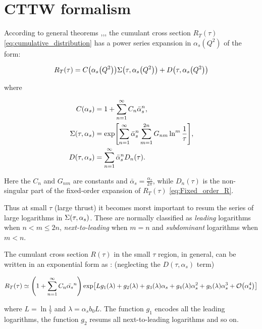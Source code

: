 \documentclass[../main.tex]{subfiles}
\begin{document}
\section{CTTW formalism}\label{sec:CTTW convention}

According to general theorems \cite{Block:1937},\cite{Kinoshita:1962ur},\cite{Lee:1964is}, 
the cumulant cross section $R_T(\tau)$ \cref{eq:cumulative_distribution} has a power series expansion in $\alpha_s(Q^2)$ of the form:

\begin{equation}\label{eq:cumulant_expansion}
    R_T(\tau) =  C\qty(\alpha_s\qty(Q^2))\Sigma\qty(\tau,\alpha_s\qty(Q^2)) + D\qty(\tau,\alpha_s\qty(Q^2))
\end{equation}

where 

\begin{align}
    C\qty(\alpha_s) &= 1 + \sum_{n=1}^{\infty} C_n \bar{\alpha}_s^n , \\
    \Sigma\qty(\tau,\alpha_s)&= \exp[\sum_{n=1}^\infty \bar{\alpha}_s^n \sum_{m=1}^{2n}G_{nm}\ln^m \frac{1}{\tau}] \label{eq:sigma} ,\\
    D(\tau,\alpha_s) &= \sum_{n=1}^{\infty} \bar{\alpha}_s^n D_n(\tau).
\end{align}

Here the $C_n$ and $G_{nm}$ are constants and $\bar{\alpha}_s = \frac{\alpha_s}{2\pi}$, while $D_n(\tau)$ 
is the non-singular part of the fixed-order expansion of $R_T(\tau)$ \cref{eq:Fixed_order_R}.

Thus at small $\tau$ (large thrust) it becomes morst important to resum the series of large logarithms in $\Sigma\qty(\tau,\alpha_s)$.
These are normally classified as \emph{leading} logarithms when $n < m \le 2n$, \emph{next-to-leading} when $m = n$ 
and \emph{subdominant} logarithms when $m < n$. 

The cumulant cross section $R(\tau)$ in the small $\tau$ region, in general, can be written in an exponential form as : (neglecting the $D(\tau,\alpha_s)$ term)

\begin{equation}\label{eq:resummed_R}
    R_T(\tau) \simeq \qty(1 + \sum_{n=1}^{\infty} C_n \bar{\alpha_s}^n)\exp[L g_1(\lambda)  + g_2(\lambda) + g_3(\lambda) \alpha_s + g_4(\lambda) \alpha_s^2 + g_5(\lambda) \alpha_s^3 + \order{\alpha_s^4}]
\end{equation}

where $L = \ln \frac{1}{\tau}$ and $\lambda = \alpha_s b_0 L$. The function $g_1$ encodes all the leading logarithms, the function $g_2$
resums all next-to-leading logarithms and so on.
\end{document}
